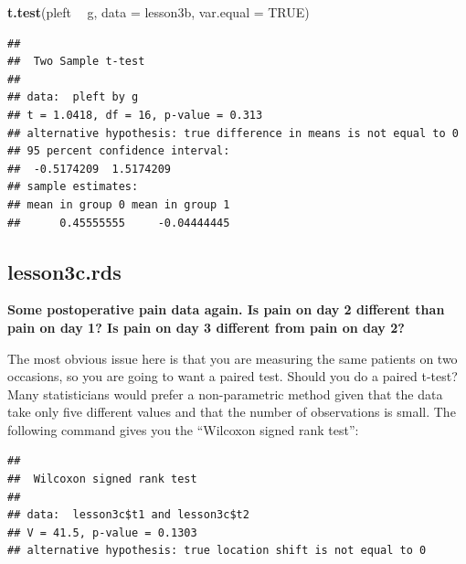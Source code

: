 \documentclass[]{book}
\newenvironment{Shaded}{\begin{snugshade}}{\end{snugshade}}
\newcommand{\DataTypeTok}[1]{\textcolor[rgb]{0.13,0.29,0.53}{#1}}
\newcommand{\KeywordTok}[1]{\textcolor[rgb]{0.13,0.29,0.53}{\textbf{#1}}}
\newcommand{\NormalTok}[1]{#1}
\newcommand{\OperatorTok}[1]{\textcolor[rgb]{0.81,0.36,0.00}{\textbf{#1}}}
\newcommand{\OtherTok}[1]{\textcolor[rgb]{0.56,0.35,0.01}{#1}}
\newcommand{\StringTok}[1]{\textcolor[rgb]{0.31,0.60,0.02}{#1}}
\begin{document}
\begin{Shaded}
\begin{Highlighting}[]
\KeywordTok{t.test}\NormalTok{(pleft }\OperatorTok{~}\StringTok{ }\NormalTok{g, }\DataTypeTok{data =}\NormalTok{ lesson3b, }\DataTypeTok{var.equal =} \OtherTok{TRUE}\NormalTok{)}
\end{Highlighting}
\end{Shaded}

\begin{verbatim}
## 
##  Two Sample t-test
## 
## data:  pleft by g
## t = 1.0418, df = 16, p-value = 0.313
## alternative hypothesis: true difference in means is not equal to 0
## 95 percent confidence interval:
##  -0.5174209  1.5174209
## sample estimates:
## mean in group 0 mean in group 1 
##      0.45555555     -0.04444445
\end{verbatim}

\hypertarget{lesson3c.rds}{%
\subsection{lesson3c.rds}\label{lesson3c.rds}}

\textbf{Some postoperative pain data again. Is pain on day 2 different
than pain on day 1? Is pain on day 3 different from pain on day 2?}

The most obvious issue here is that you are measuring the same patients
on two occasions, so you are going to want a paired test. Should you do
a paired t-test? Many statisticians would prefer a non-parametric method
given that the data take only five different values and that the number
of observations is small. The following command gives you the ``Wilcoxon
signed rank test'':

\begin{Shaded}
\end{Shaded}

\begin{verbatim}
## 
##  Wilcoxon signed rank test
## 
## data:  lesson3c$t1 and lesson3c$t2
## V = 41.5, p-value = 0.1303
## alternative hypothesis: true location shift is not equal to 0
\end{verbatim}
\end{document}
